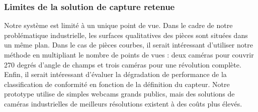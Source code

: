 
\subsubsection{Limites de la solution de capture retenue}
Notre système est limité à un unique point de vue.
Dans le cadre de notre problématique industrielle, les surfaces qualitatives des pièces sont situées dans un même plan.
Dans le cas de pièces courbes, il serait intéressant d’utiliser notre méthode en multipliant le nombre de points de vues : deux caméras pour couvrir 270 degrés d’angle de champs et trois caméras pour une révolution complète.
Enfin, il serait intéressant d’évaluer la dégradation de performance de la classification de conformité en fonction de la définition du capteur.
Notre prototype utilise de simples webcams grands publics, mais des solutions de caméras industrielles de meilleurs résolutions existent à des coûts plus élevés.



